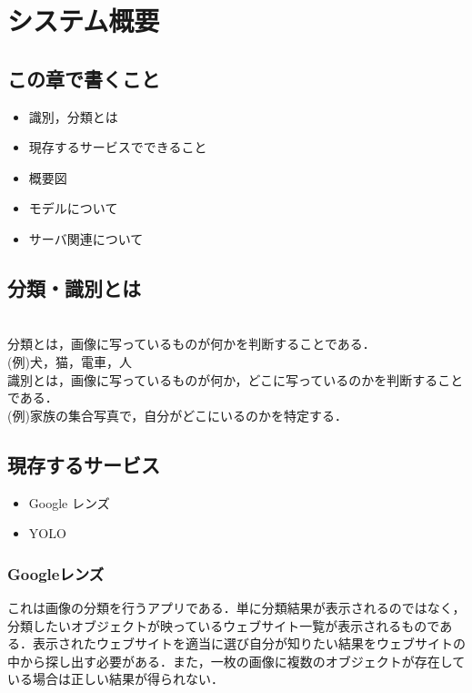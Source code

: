 

\chapter{システム概要}
\section{この章で書くこと}
\begin{itemize}
	\item 識別，分類とは
	\item 現存するサービスでできること
	\item 概要図
	\item モデルについて
	\item サーバ関連について
\end{itemize}
\section{分類・識別とは}
\\
分類とは，画像に写っているものが何かを判断することである．\\
(例)犬，猫，電車，人\\
識別とは，画像に写っているものが何か，どこに写っているのかを判断することである．\\
(例)家族の集合写真で，自分がどこにいるのかを特定する．
\section{現存するサービス}
\begin{itemize}
	\item Google レンズ
	\item YOLO
\end{itemize}

\subsection{Googleレンズ}\label{google-service}
これは画像の分類を行うアプリである．単に分類結果が表示されるのではなく，分類したいオブジェクトが映っているウェブサイト一覧が表示されるものである．表示されたウェブサイトを適当に選び自分が知りたい結果をウェブサイトの中から探し出す必要がある．また，一枚の画像に複数のオブジェクトが存在している場合は正しい結果が得られない．

